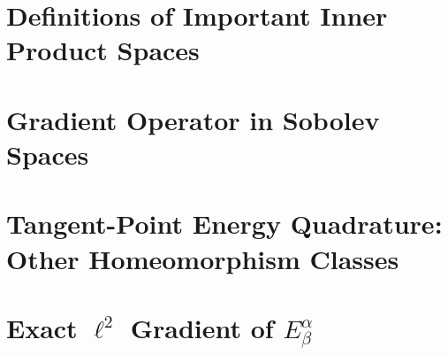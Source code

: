 \documentclass[a4paper, 12pt]{article}
\numberwithin{equation}{section}
\numberwithin{figure}{section}
\theoremstyle{definition}
\theoremstyle{plain}
\theoremstyle{plain}
\theoremstyle{plain}
\theoremstyle{remark}
\numberwithin{theorem}{section}
\theoremstyle{definition}
\begin{document}
\newpage
%
\begin{appendices}
    \section{Definitions of Important Inner Product Spaces}
    \label{sct: Definitions of Important Inner Product Spaces}
    
    \section{Gradient Operator in Sobolev Spaces}
    \label{sct: Integration By Parts}
    
    \section{Tangent-Point Energy Quadrature: Other Homeomorphism Classes}
    \label{sct: Other Homeomorphism Classes}
    
    \section{Exact $\ell^2$ Gradient of $E_{\beta}^{\alpha}$}
    \label{sct: Exact Gradient}
    
\end{appendices}

\printbibliography
\end{document}
